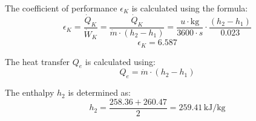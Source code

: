 The coefficient of performance \( \epsilon_K \) is calculated using the formula:  
\[
\epsilon_K = \frac{\dot{Q}_K}{\dot{W}_K} = \frac{\dot{Q}_K}{\dot{m} \cdot (h_2 - h_1)} = \frac{u \cdot \text{kg}}{3600 \cdot s} \cdot \frac{(h_2 - h_1)}{0.023}
\]  
\[
\epsilon_K = 6.587
\]  

The heat transfer \( Q_e \) is calculated using:  
\[
Q_e = \dot{m} \cdot (h_2 - h_1)
\]  

The enthalpy \( h_2 \) is determined as:  
\[
h_2 = \frac{258.36 + 260.47}{2} = 259.41 \, \text{kJ/kg}
\]